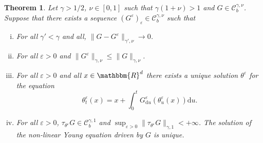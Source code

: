 \documentclass[a4paper,11pt]{article}
\newcommand{\mathd}{\mathrm{d}}
\newcommand{\nocomma}{}
\newenvironment{enumerateroman}{\begin{enumerate}[i.] }{\end{enumerate}}
\newtheorem{theorem}{Theorem}[section]
\newcommand{\CC}{\mathscr C}
\begin{document}
\begin{theorem}
  \label{theorem:uniqueness_general_case}Let $\gamma >1/2 \nocomma$, $\nu \in
  [ 0,1 ]$ such that $\gamma ( 1+ \nu ) >1$ and $G \in \CC^{\gamma ,
  \nu}_{b}$. Suppose that there exists a sequence $( G^{\varepsilon}
  )_{\varepsilon} \in \CC^{\gamma , \nu}_{b}$ such that
  \begin{enumerateroman}
    \item For all $\gamma' < \gamma$ and all, $\| G-G^{\varepsilon}
    \|_{\gamma' , \nu} \rightarrow 0$.
    
    \item For all $\varepsilon >0$ and $\| G^{\varepsilon} \|_{\gamma , \nu}
    \leqslant \| G \|_{\gamma , \nu}$.
    
    \item For all $\varepsilon >0$ and all $x \in \mathbbm{R}^{d}$ there
    exists a unique solution $\theta^{\varepsilon}$ for the equation
    \[ \theta^{\varepsilon}_{t} ( x ) =x+ \int_{0}^{t}
       G^{\varepsilon}_{\mathd u} ( \theta^{\varepsilon}_{u} ( x ) ) \mathd u.
    \]
    \item For all $\varepsilon >0$, $\tau_{\theta^{\varepsilon}} G \in
    \CC^{\gamma ,1}_{b}$ and
    $ \sup_{\varepsilon >0} \| \tau_{\theta^{\varepsilon}} G \|_{\gamma ,1}
       <+ \infty $. 
    The solution of the non-linear Young equation driven by $G$ is unique.
  \end{enumerateroman}
\end{theorem}
\end{document}
